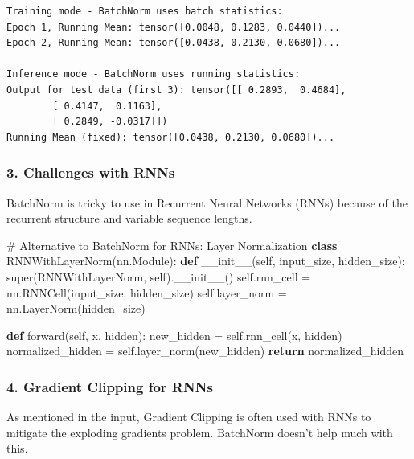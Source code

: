 \documentclass[
  letterpaper,
  DIV=11,
  numbers=noendperiod]{scrreprt}
\newenvironment{Shaded}{\begin{snugshade}}{\end{snugshade}}
\newcommand{\BuiltInTok}[1]{\textcolor[rgb]{0.00,0.23,0.31}{#1}}
\newcommand{\CommentTok}[1]{\textcolor[rgb]{0.37,0.37,0.37}{#1}}
\newcommand{\ControlFlowTok}[1]{\textcolor[rgb]{0.00,0.23,0.31}{\textbf{#1}}}
\newcommand{\FunctionTok}[1]{\textcolor[rgb]{0.28,0.35,0.67}{#1}}
\newcommand{\KeywordTok}[1]{\textcolor[rgb]{0.00,0.23,0.31}{\textbf{#1}}}
\newcommand{\NormalTok}[1]{\textcolor[rgb]{0.00,0.23,0.31}{#1}}
\newcommand{\OperatorTok}[1]{\textcolor[rgb]{0.37,0.37,0.37}{#1}}
\newcommand{\VariableTok}[1]{\textcolor[rgb]{0.07,0.07,0.07}{#1}}
\begin{document}
\begin{verbatim}
Training mode - BatchNorm uses batch statistics:
Epoch 1, Running Mean: tensor([0.0048, 0.1283, 0.0440])...
Epoch 2, Running Mean: tensor([0.0438, 0.2130, 0.0680])...

Inference mode - BatchNorm uses running statistics:
Output for test data (first 3): tensor([[ 0.2893,  0.4684],
        [ 0.4147,  0.1163],
        [ 0.2849, -0.0317]])
Running Mean (fixed): tensor([0.0438, 0.2130, 0.0680])...
\end{verbatim}

\subsubsection{3. Challenges with RNNs}\label{challenges-with-rnns}

BatchNorm is tricky to use in Recurrent Neural Networks (RNNs) because
of the recurrent structure and variable sequence lengths.

\begin{Shaded}
\begin{Highlighting}[]
\CommentTok{\# Alternative to BatchNorm for RNNs: Layer Normalization}
\KeywordTok{class}\NormalTok{ RNNWithLayerNorm(nn.Module):}
    \KeywordTok{def} \FunctionTok{\_\_init\_\_}\NormalTok{(}\VariableTok{self}\NormalTok{, input\_size, hidden\_size):}
        \BuiltInTok{super}\NormalTok{(RNNWithLayerNorm, }\VariableTok{self}\NormalTok{).}\FunctionTok{\_\_init\_\_}\NormalTok{()}
        \VariableTok{self}\NormalTok{.rnn\_cell }\OperatorTok{=}\NormalTok{ nn.RNNCell(input\_size, hidden\_size)}
        \VariableTok{self}\NormalTok{.layer\_norm }\OperatorTok{=}\NormalTok{ nn.LayerNorm(hidden\_size)}
        
    \KeywordTok{def}\NormalTok{ forward(}\VariableTok{self}\NormalTok{, x, hidden):}
\NormalTok{        new\_hidden }\OperatorTok{=} \VariableTok{self}\NormalTok{.rnn\_cell(x, hidden)}
\NormalTok{        normalized\_hidden }\OperatorTok{=} \VariableTok{self}\NormalTok{.layer\_norm(new\_hidden)}
        \ControlFlowTok{return}\NormalTok{ normalized\_hidden}
\end{Highlighting}
\end{Shaded}

\subsubsection{4. Gradient Clipping for
RNNs}\label{gradient-clipping-for-rnns}

As mentioned in the input, Gradient Clipping is often used with RNNs to
mitigate the exploding gradients problem. BatchNorm doesn't help much
with this.
\end{document}

